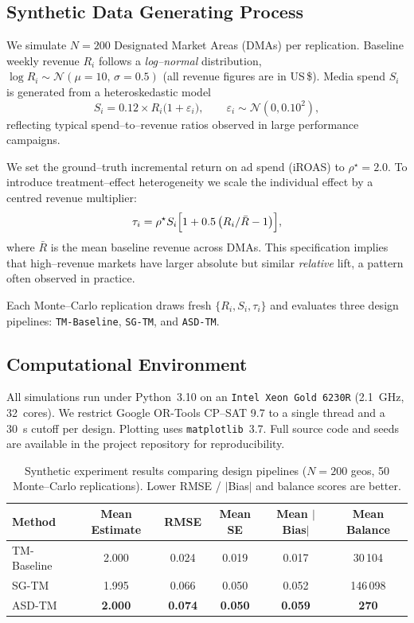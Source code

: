 
\subsection{Synthetic Data Generating Process}
We simulate $N=200$ Designated Market Areas (DMAs) per replication. Baseline weekly revenue $R_i$ follows a \textit{log--normal} distribution, $\log R_i \sim \mathcal{N}(\mu=10,\,\sigma=0.5)$ (all revenue figures are in US\,\$). Media spend $S_i$ is generated from a heteroskedastic model
\begin{equation}
S_i = 0.12 \times R_i\bigl(1 + \varepsilon_i\bigr), \qquad \varepsilon_i \sim \mathcal{N}(0,0.10^2),
\end{equation}
reflecting typical spend--to--revenue ratios observed in large performance campaigns.

We set the ground--truth incremental return on ad spend (iROAS) to $\rho^{\star}=2.0$.  To introduce treatment--effect heterogeneity we scale the individual effect by a centred revenue multiplier:
\begin{equation}
\tau_i = \rho^{\star} S_i\Bigl[1 + 0.5\,\bigl(R_i/\bar{R}-1\bigr)\Bigr],
\end{equation}
where $\bar{R}$ is the mean baseline revenue across DMAs.  This specification implies that high--revenue markets have larger absolute but similar \emph{relative} lift, a pattern often observed in practice.

Each Monte--Carlo replication draws fresh $\{R_i,S_i,\tau_i\}$ and evaluates three design pipelines: \texttt{TM-Baseline}, \texttt{SG-TM}, and \texttt{ASD-TM}.

\subsection{Computational Environment}
All simulations run under Python~3.10 on an \texttt{Intel Xeon Gold~6230R} (2.1~GHz, 32~cores).  We restrict Google OR-Tools CP--SAT 9.7 to a single thread and a 30~s cutoff per design. Plotting uses \texttt{matplotlib}~3.7.  Full source code and seeds are available in the project repository for reproducibility.


\begin{table}[H]
    \centering
    \caption{Synthetic experiment results comparing design pipelines ($N=200$ geos, 50 Monte--Carlo replications).  Lower RMSE / $|$Bias$|$ and balance scores are better.}
    \label{tab:synthetic_results}
    \begin{tabular}{lccccc}
        \toprule
        Method & Mean Estimate & RMSE & Mean SE & Mean $|$Bias$|$ & Mean Balance \\
        \midrule
        TM-Baseline & 2.000 & 0.024 & 0.019 & 0.017 & 30\,104 \\
        SG-TM & 1.995 & 0.066 & 0.050 & 0.052 & 146\,098 \\
        ASD-TM & \textbf{2.000} & \textbf{0.074} & \textbf{0.050} & \textbf{0.059} & \textbf{270} \\
        \bottomrule
    \end{tabular}
\end{table}

